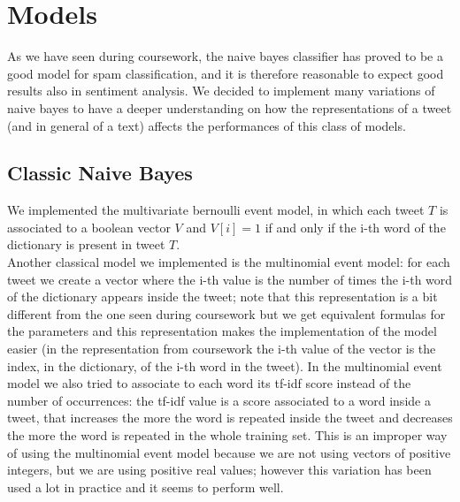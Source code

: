 \section*{Models}
As we have seen during coursework, the naive bayes classifier has proved to be a good model for spam classification, and it is therefore reasonable to expect good results also in sentiment analysis. We decided to implement many variations of naive bayes to have a deeper understanding on how the representations of a tweet (and in general of a text) affects the performances of this class of models.
\subsection*{Classic Naive Bayes}
 We implemented the multivariate bernoulli event model, in which each tweet $T$ is associated to a boolean vector $V$ and $V[i]=1$ if and only if the i-th word of the dictionary is present in tweet $T$. \\
Another classical model we implemented is the multinomial event model: for each tweet we create a vector where the i-th value is the number of times the i-th word of the dictionary appears inside the tweet; note that this representation is a bit different from the one seen during coursework but we get equivalent formulas for the parameters and this representation makes the implementation of the model easier (in the representation from coursework the i-th value of the vector is the index, in the dictionary, of the i-th word in the tweet). In the multinomial event model we also tried to associate to each word its tf-idf score instead of the number of occurrences: the tf-idf value is a score associated to a word inside a tweet, that increases the more the word is repeated inside the tweet and decreases the more the word is repeated in the whole training set. This is an improper way of using the multinomial event model because we are not using vectors of positive integers, but we are using positive real values; however this variation has been used a lot in practice and it seems to perform well.

